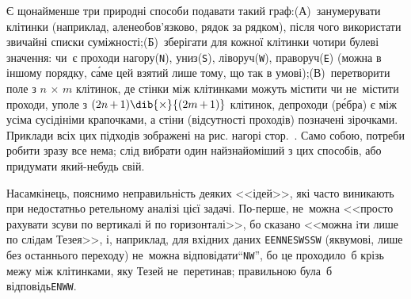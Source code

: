 {\begin{figure*}
\begin{minipage}{\textwidth}
\end{minipage}

\vspace{\baselineskip}

\myhrulefill

\label{fig:201213-2-Maze}

\end{figure*}

Є щонайменше три природні способи подавати такий граф:\linebreak[2]
(А)~занумерувати клітинки (наприклад, але\nolinebreak[2] не\nolinebreak[3] обов'язково, рядок за рядком), після чого використати звичайні списки суміжності;\linebreak[2]
(Б)~зберігати для кожної клітинки чотири булеві значення: 
чи~є проходи нагору\nolinebreak[3] (\texttt{N}),
униз\nolinebreak[3] (\texttt{S}),
ліворуч\nolinebreak[3] (\texttt{W}),
праворуч\nolinebreak[3] (\texttt{E}) (можна в іншому порядку, с\'{а}ме цей взятий лише тому, що так в умові);\linebreak[2]
(В)~перетворити поле з ${n\,{\times}\,m}$ клітинок, де стінки між клітинками можуть містити чи не~містити проходи, у\nolinebreak[2] поле з ${(2n\,{+}\,1)}\dib{{\times}}{(2m\,{+}\,1)}$ клітинок, де\nolinebreak[2] проходи (р\'{е}бра) є між усіма сусідініми крапочками, а стіни (відсутності проходів) позначені зірочками. Приклади всіх цих підходів зображені на рис. нагорі стор.~\pageref{fig:201213-2-Maze}. Само собою, потреби робити зразу все нема; слід вибрати один найзнайоміший з цих способів, або придумати який-небудь свій.

\myhrulefill

Насамкінець, пояснимо неправильність деяких <<ідей>>, які часто виникають при недостатньо ретельному аналізі цієї задачі. 
По-перше, не~можна <<просто рахувати зсуви по вертикалі й по горизонталі>>, бо сказано <<можна iти лише по слiдам Тезея>>, і, наприклад, для вхідних даних \texttt{EENNESWSSW} (як\nolinebreak[2] в\nolinebreak[2] умові, лише без останнього переходу) не~можна відповідати\nolinebreak[3] ``\texttt{NW}'', бо це проходило~б крізь межу між клітинками, яку Тезей не~перетинав; правильною була~б відповідь\nolinebreak[3] \texttt{ENWW}.

}
